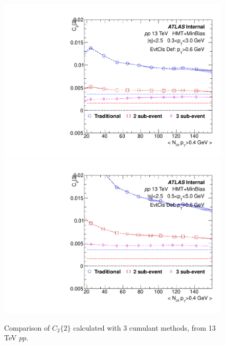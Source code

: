 \begin{figure}[p]
\includegraphics[width=0.4\linewidth]{figs/sec_result/pp13/phy_2PC_Har0_Pt0_Cls3.pdf}
\includegraphics[width=0.4\linewidth]{figs/sec_result/pp13/phy_2PC_Har0_Pt1_Cls3.pdf}
\caption{Comparison of $C_{2}\{2\}$ calculated with 3 cumulant methods, from 13 TeV $pp$.}
\label{fig:result_pp13_C22}
\end{figure}
\clearpage

